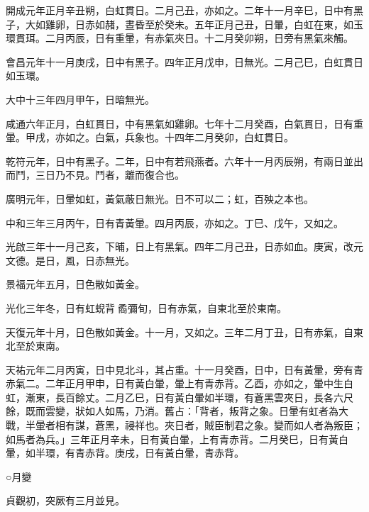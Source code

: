 \begin{pinyinscope}
 開成元年正月辛丑朔，白虹貫日。二月己丑，亦如之。二年十一月辛巳，日中有黑子，大如雞卵，日赤如赭，晝昏至於癸未。五年正月己丑，日暈，白虹在東，如玉環貫珥。二月丙辰，日有重暈，有赤氣夾日。十二月癸卯朔，日旁有黑氣來觸。



 會昌元年十一月庚戌，日中有黑子。四年正月戊申，日無光。二月己巳，白虹貫日如玉環。



 大中十三年四月甲午，日暗無光。



 咸通六年正月，白虹貫日，中有黑氣如雞卵。七年十二月癸酉，白氣貫日，日有重暈。甲戌，亦如之。白氣，兵象也。十四年二月癸卯，白虹貫日。



 乾符元年，日中有黑子。二年，日中有若飛燕者。六年十一月丙辰朔，有兩日並出而鬥，三日乃不見。鬥者，離而復合也。



 廣明元年，日暈如虹，黃氣蔽日無光。日不可以二；虹，百殃之本也。



 中和三年三月丙午，日有青黃暈。四月丙辰，亦如之。丁巳、戊午，又如之。



 光啟三年十一月己亥，下晡，日上有黑氣。四年二月己丑，日赤如血。庚寅，改元文德。是日，風，日赤無光。



 景福元年五月，日色散如黃金。



 光化三年冬，日有虹蜺背矞彌旬，日有赤氣，自東北至於東南。



 天復元年十月，日色散如黃金。十一月，又如之。三年二月丁丑，日有赤氣，自東北至於東南。



 天祐元年二月丙寅，日中見北斗，其占重。十一月癸酉，日中，日有黃暈，旁有青赤氣二。二年正月甲申，日有黃白暈，暈上有青赤背。乙酉，亦如之，暈中生白虹，漸東，長百餘丈。二月乙巳，日有黃白暈如半環，有蒼黑雲夾日，長各六尺餘，既而雲變，狀如人如馬，乃消。舊占：「背者，叛背之象。日暈有虹者為大戰，半暈者相有謀，蒼黑，祲祥也。夾日者，賊臣制君之象。變而如人者為叛臣；如馬者為兵。」三年正月辛未，日有黃白暈，上有青赤背。二月癸巳，日有黃白暈，如半環，有青赤背。庚戌，日有黃白暈，青赤背。



 ○月變



 貞觀初，突厥有三月並見。




\end{pinyinscope}
